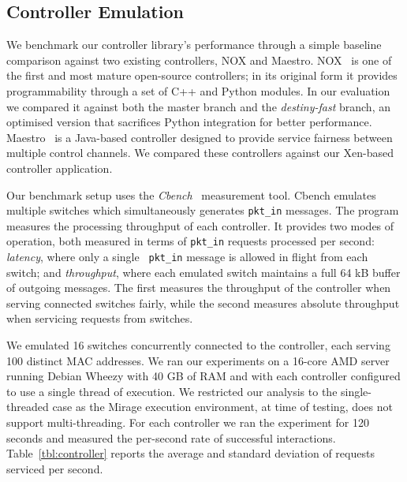 \subsection{\mirage Controller Emulation} \label{sec:of-controller-perf}

We benchmark our controller library's performance through a simple baseline
comparison against two existing \of controllers, NOX and Maestro.
NOX~ is one of the first and most mature open-source \of controllers;
in its original form it provides programmability through a set of C++ and Python
modules.  In our evaluation we compared it against both the master branch and the
{\it destiny-fast} \/branch, an optimised version that sacrifices Python
integration for better performance.  Maestro~ is a Java-based
controller designed to provide service fairness between multiple \of control
channels.  We compared these controllers against our Xen-based \mirage \of
controller application.

Our benchmark setup uses the {\it Cbench}~ measurement tool. Cbench
emulates multiple switches which simultaneously generates {\tt pkt\_in}
messages.  The program measures the processing throughput of each controller.
It provides two modes of operation, both measured in terms of {\tt pkt\_in}
requests processed per second: {\it latency}, where only a single {\tt
  pkt\_in} message is allowed in flight from each switch; and {\it
  throughput}, where each emulated switch maintains a full 64 kB buffer of
outgoing messages. The first measures the throughput of the controller when
serving connected switches fairly, while the second measures absolute throughput
when servicing requests from switches.

We emulated 16 switches concurrently connected to the controller, each serving
100 distinct MAC addresses. We ran our experiments on a 16-core AMD server
running Debian Wheezy with 40 GB of RAM and with each controller configured to use a
single thread of execution. We restricted our analysis to the single-threaded case
as the Mirage execution environment, at time of testing, does not support
multi-threading. For each controller we ran the experiment for 120 seconds and
measured the per-second rate of successful interactions.
Table~\ref{tbl:controller} reports the average and standard deviation of
requests serviced per second.

